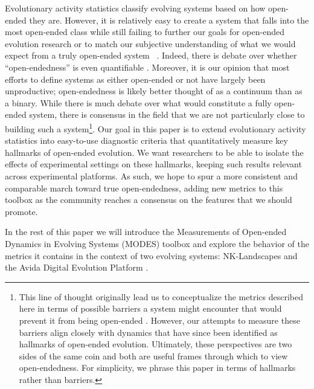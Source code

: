 \documentclass[letterpaper]{article}
\begin{document}
Evolutionary activity statistics classify evolving systems based on how open-ended they are. However, it is relatively easy to create a system that falls into the most open-ended class while still failing to further our goals for open-ended evolution research or to match our subjective understanding of what we would expect from a truly open-ended system ~\citep{maley_four_1999}. Indeed, there is debate over whether ``open-endedness'' is even quantifiable \citep{stanley_role_2016}. Moreover, it is our opinion that most efforts to define systems as either open-ended or not have largely been unproductive; open-endedness is likely better thought of as a continuum than as a binary. While there is much debate over what would constitute a fully open-ended system, there is consensus in the field that we are not particularly close to building such a system\footnote{This line of thought originally lead us to conceptualize the metrics described here in terms of possible barriers a system might encounter that would prevent it from being open-ended \citep{dolson_whats_2015}. However, our attempts to measure these barriers align closely with dynamics that have since been identified as hallmarks of open-ended evolution. Ultimately, these perspectives are two sides of the same coin and both are useful frames through which to view open-endedness. For simplicity, we phrase this paper in terms of hallmarks rather than barriers.}. 
Our goal in this paper is to extend evolutionary activity statistics into easy-to-use diagnostic criteria that quantitatively measure key hallmarks of open-ended evolution.  We want researchers to be able to isolate the effects of experimental settings on these hallmarks, keeping such results relevant across experimental platforms. As such, we hope to spur a more consistent and comparable march toward true open-endedness, adding new metrics to this toolbox as the community reaches a consensus on the features that we should promote.


In the rest of this paper we will introduce the Measurements of Open-ended Dynamics in Evolving Systems (MODES) toolbox and explore the behavior of the metrics it contains in the context of two evolving systems: NK-Landscapes \citep{kauffman_towards_1987} and the Avida Digital Evolution Platform \citep{ofria_avida:_2004}.
\end{document}

